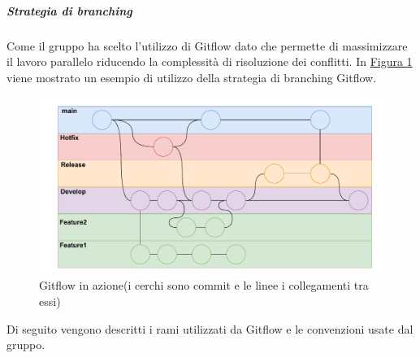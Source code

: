 \subparagraph{Strategia di branching}
\label{subpar:strategia_di_branching_documenti}
Come  il gruppo ha scelto l'utilizzo di Gitflow dato che permette di massimizzare il lavoro parallelo riducendo la complessità di risoluzione dei conflitti.
In \hyperref[fig:gitflow]{Figura \ref{fig:gitflow}} viene mostrato un esempio di utilizzo della strategia di branching Gitflow.
\begin{figure}[H]
    \includegraphics[scale=0.65]{Sezioni/ProcessiDiSupporto/Immagini/gitflow.pdf}
    \caption{Gitflow in azione(i cerchi sono commit e le linee i collegamenti tra essi)}
    \label{fig:gitflow}
\end{figure}
Di seguito vengono descritti i rami utilizzati da Gitflow e le convenzioni usate dal gruppo.
